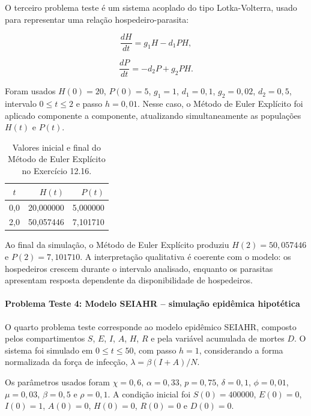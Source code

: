 O terceiro problema teste é um sistema acoplado do tipo Lotka-Volterra, usado para representar uma relação hospedeiro-parasita:

\[
    \frac{dH}{dt}=g_1H-d_1PH,
\]

\[
    \frac{dP}{dt}=-d_2P+g_2PH.
\]

Foram usados \(H(0)=20\), \(P(0)=5\), \(g_1=1\), \(d_1=0{,}1\), \(g_2=0{,}02\), \(d_2=0{,}5\), intervalo \(0\leq t\leq 2\) e passo \(h=0{,}01\). Nesse caso, o Método de Euler Explícito foi aplicado componente a componente, atualizando simultaneamente as populações \(H(t)\) e \(P(t)\).

\begin{table}[H]
    \centering
    \caption{Valores inicial e final do Método de Euler Explícito no Exercício 12.16.}
    \begin{tabular}{c|r|r}
        \textbf{\(t\)} & \textbf{\(H(t)\)} & \textbf{\(P(t)\)} \\
        \hline
        0{,}0 & 20{,}000000 & 5{,}000000 \\
        2{,}0 & 50{,}057446 & 7{,}101710 \\
    \end{tabular}
\end{table}

Ao final da simulação, o Método de Euler Explícito produziu \(H(2)=50{,}057446\) e \(P(2)=7{,}101710\). A interpretação qualitativa é coerente com o modelo: os hospedeiros crescem durante o intervalo analisado, enquanto os parasitas apresentam resposta dependente da disponibilidade de hospedeiros.

\paragraph{Problema Teste 4: Modelo SEIAHR -- simulação epidêmica hipotética}

O quarto problema teste corresponde ao modelo epidêmico SEIAHR, composto pelos compartimentos \(S\), \(E\), \(I\), \(A\), \(H\), \(R\) e pela variável acumulada de mortes \(D\). O sistema foi simulado em \(0\leq t\leq 50\), com passo \(h=1\), considerando a forma normalizada da força de infecção, \(\lambda=\beta(I+A)/N\).

Os parâmetros usados foram \(\chi=0{,}6\), \(\alpha=0{,}33\), \(p=0{,}75\), \(\delta=0{,}1\), \(\phi=0{,}01\), \(\mu=0{,}03\), \(\beta=0{,}5\) e \(\rho=0{,}1\). A condição inicial foi \(S(0)=400000\), \(E(0)=0\), \(I(0)=1\), \(A(0)=0\), \(H(0)=0\), \(R(0)=0\) e \(D(0)=0\).


